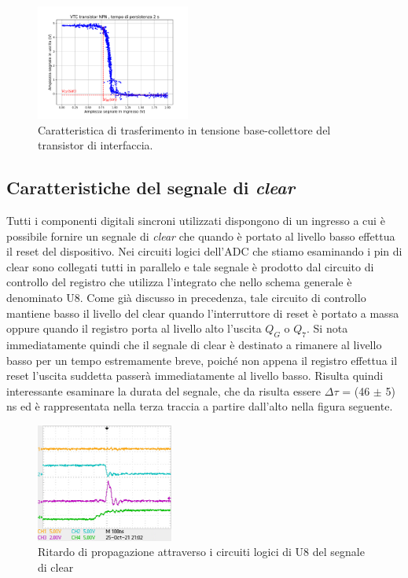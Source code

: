 \documentclass[journal]{IEEEtran}
\begin{document}
\begin{figure}[H]%
\begin{center}
\includegraphics[width=0.45\textwidth]{analysis/output/NPN-XY.pdf}
\caption{Caratteristica di trasferimento in tensione base-collettore del transistor di interfaccia.}
\label{fig:VTC-bjt}
\end{center}
\end{figure}


\subsection{Caratteristiche del segnale di \textit{clear}}
Tutti i componenti digitali sincroni utilizzati dispongono di un ingresso a cui è possibile fornire un segnale di \textit{clear} che quando è portato al livello basso effettua il reset del dispositivo. Nei circuiti logici dell'ADC che stiamo esaminando i pin di clear sono collegati tutti in parallelo e tale segnale è prodotto dal circuito di controllo del registro che utilizza l'integrato che nello schema generale è denominato U8. Come già discusso in precedenza, tale circuito di controllo mantiene basso il livello del clear quando l'interruttore di reset è portato a massa oppure quando il registro porta al livello alto l'uscita $Q_G$ o $Q_7$. Si nota immediatamente quindi che il segnale di clear è destinato a rimanere al livello basso per un tempo estremamente breve, poiché non appena il registro effettua il reset l'uscita suddetta passerà immediatamente al livello basso. Risulta quindi interessante esaminare la durata del segnale, che da risulta essere $\Delta \tau$ = (46 $\pm$ 5) ns ed è rappresentata nella terza traccia a partire dall'alto nella figura seguente.

\begin{figure}[H]%
\begin{center}
\includegraphics[width=0.40\textwidth]{data-source/25-10-21/clear.jpg}
\caption{Ritardo di propagazione attraverso i circuiti logici di U8 del segnale di clear}
\label{fig:clear-delay}
\end{center}
\end{figure}
\end{document}
